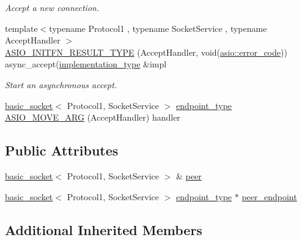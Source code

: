 \begin{DoxyCompactItemize}
\begin{DoxyCompactList}\small\item\em Accept a new connection. \end{DoxyCompactList}\item 
{\footnotesize template$<$typename Protocol1 , typename Socket\+Service , typename Accept\+Handler $>$ }\\\hyperlink{classasio_1_1socket__acceptor__service_a9e27322c968018def35fb0f400340681}{A\+S\+I\+O\+\_\+\+I\+N\+I\+T\+F\+N\+\_\+\+R\+E\+S\+U\+L\+T\+\_\+\+T\+Y\+P\+E} (Accept\+Handler, void(\hyperlink{classasio_1_1error__code}{asio\+::error\+\_\+code})) async\+\_\+accept(\hyperlink{classasio_1_1socket__acceptor__service_ae91b355a38c59424f68df71fcd9fffb8}{implementation\+\_\+type} \&impl
\begin{DoxyCompactList}\small\item\em Start an asynchronous accept. \end{DoxyCompactList}\item 
\hyperlink{classasio_1_1basic__socket}{basic\+\_\+socket}$<$ Protocol1, Socket\+Service $>$ \hyperlink{classasio_1_1socket__acceptor__service_a2e266541d8da5db4af397b4a62bc3923}{endpoint\+\_\+type} \hyperlink{classasio_1_1socket__acceptor__service_ac5bfb0ba6c4b557d403bb6627e9642c4}{A\+S\+I\+O\+\_\+\+M\+O\+V\+E\+\_\+\+A\+R\+G} (Accept\+Handler) handler
\end{DoxyCompactItemize}
\subsection*{Public Attributes}
\begin{DoxyCompactItemize}
\item 
\hyperlink{classasio_1_1basic__socket}{basic\+\_\+socket}$<$ Protocol1, Socket\+Service $>$ \& \hyperlink{classasio_1_1socket__acceptor__service_aca6046131e63a54ab7c85cea721d4c53}{peer}
\item 
\hyperlink{classasio_1_1basic__socket}{basic\+\_\+socket}$<$ Protocol1, Socket\+Service $>$ \hyperlink{classasio_1_1socket__acceptor__service_a2e266541d8da5db4af397b4a62bc3923}{endpoint\+\_\+type} $\ast$ \hyperlink{classasio_1_1socket__acceptor__service_a680888264a952847bd9942de4444e183}{peer\+\_\+endpoint}
\end{DoxyCompactItemize}
\subsection*{Additional Inherited Members}


